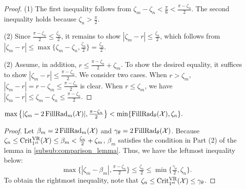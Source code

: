 \begin{proof}
    	(1) The first inequality follows from $\zeta_m - \zeta_n < \tfrac{\pi}{6} < \tfrac{\pi - \zeta_n}{2}$.
        The second inequality holds because $\zeta_n > \tfrac{\pi}{2}$.
     
        (2) Since $\tfrac{\pi - \zeta_n}{2} \leq \tfrac{\zeta_n}{2}$, it remains to show $|\zeta_m  - r | \leq \tfrac{\zeta_n}{2}$, which follows from
    	\(
    	|\zeta_m  - r | \leq \max\big\{\zeta_m - \zeta_n, \tfrac{\zeta_n}{2}\big\} = \tfrac{\zeta_n}{2}.
    	\)

    	(2) Assume, in addition, $r \leq \tfrac{\pi - \zeta_n}{2} + \zeta_m$.
        To show the desired equality, it suffices to show $|\zeta_m  - r | \leq \tfrac{\pi - \zeta_n}{2}$.
        We consider two cases.
        When $r > \zeta_m$,
    	$|\zeta_m  - r | = r - \zeta_m \leq
        \tfrac{\pi - \zeta_n}{2}
    	$ is clear.
    	When $r \leq \zeta_m$, we have
    	\(
    	|\zeta_m  - r | \leq \zeta_m - \zeta_n
    	\leq \tfrac{\pi - \zeta_n}{2}.
    	\)
\end{proof}

\medskip \corollary
\(\max\big\{|\zeta_m  - 2\operatorname{FillRad}_{m}(\mathcal{X}) |, \tfrac{\pi - \zeta_n}{2}\big\} < \min\{\operatorname{FillRad}_{\theta}(\mathcal{X}), \zeta_n\}.\)
\begin{proof}
    Let $\beta_m = 2\operatorname{FillRad}_{m}(\mathcal{X})$ and $\gamma_\theta = 2\operatorname{FillRad}_{\theta}(\mathcal{X})$.
    Because \(\zeta_n \leq \operatorname{Crit^{\mathrm{VR}}_{1^{\mathrm{st}}}}(\mathcal{X}) \leq \beta_m < \tfrac{\zeta_n}{2} + \zeta_m\), $\beta_m$ satisfies the condition in Part (2) of the lemma in \cref{subsub:comparison_lemma}.
    Thus, we have the leftmost inequality below:
    \[
    \max\big\{|\zeta_m - \beta_m|, \tfrac{\pi - \zeta_n}{2}\big\} \leq \tfrac{\zeta_n}{2}
    \leq
    \min\big\{\tfrac{\gamma_\theta}{2}, \zeta_n\big\}.
    \]
    To obtain the rightmost inequality, note that \(\zeta_n \leq \operatorname{Crit^{\mathrm{VR}}_{1^{\mathrm{st}}}}(\mathcal{X}) \leq \gamma_\theta\).
\end{proof}



